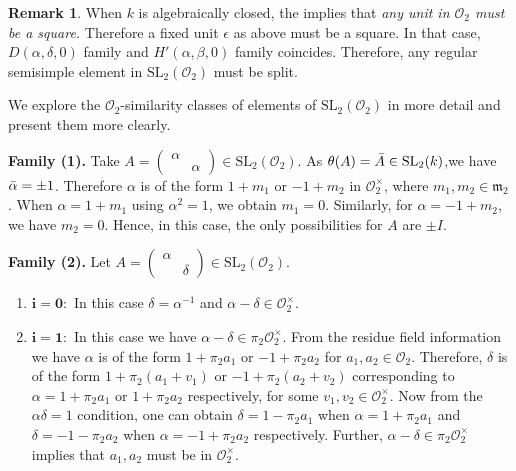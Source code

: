 \documentclass[10pt,twoside]{amsart}
\newcommand{\SL}{\mathrm{SL}}
\newcommand{\R}{\mathcal{O}_2}
\theoremstyle{definition}
\theoremstyle{definition}
\newtheorem{remark}[theorem]{Remark}
\begin{document}
\begin{remark}\label{surjpower} When $k$ is algebraically closed, the  implies that \emph{any unit in $\R$ must be a square.} Therefore a fixed unit $\epsilon$ as above must be a square. In that case, $D(\alpha, \delta, 0)$ family and $H'(\alpha, \beta, 0)$ family coincides. Therefore, any regular semisimple element in $\SL_2(\R)$ must be split. 
\end{remark}

We explore the $\R$-similarity classes of elements of $\SL_2(\R)$ in more detail and present them more clearly.

\noindent\textbf{Family (1).} Take $A = \left(\begin{array}{cc} \alpha &  \\ & \alpha
\end{array}\right)\in \SL_2(\R)$. As $\theta(A)=\Bar{A}\in \SL_2(k)$,we have $\Bar{\alpha} = \pm 1$. Therefore $\alpha$ is of the form $1 + m_1$ or $-1 + m_2$ in $\R^{\times}$, where $m_1, m_2\in \mathfrak{m}_2$. When $\alpha = 1+m_1$ using $\alpha^2=1$, we obtain $m_1=0$. Similarly, for $\alpha = -1 + m_2$, we have $m_2 = 0$. Hence, in this case, the only possibilities for $A$ are $\pm I$.

\noindent\textbf{Family (2).} Let $A = \left(\begin{array}{cc} \alpha &  \\ & \delta
\end{array}\right)\in \SL_2(\R)$. \begin{enumerate}
\item $\mathbf{i=0}:$ In this case $\delta = \alpha^{-1}$ and $\alpha - \delta\in \R^{\times}$.  
\item $\mathbf{i=1}:$ In this case we have $\alpha - \delta\in \pi_2\R^{\times}$. From the residue field information we have $\alpha$ is of the form $1+ \pi_2 a_1$ or $-1 +  \pi_2 a_2$ for $a_1, a_2 \in \R$. Therefore, $\delta$ is of the form $1 + \pi_2(a_1 + v_1)$ or $-1 + \pi_2(a_2 + v_2)$ corresponding to $\alpha = 1+ \pi_2 a_1$ or $1 + \pi_2 a_2$ respectively, for some $v_1, v_2\in \R^{\times}$. Now from the $\alpha \delta = 1$ condition, one can obtain $\delta=1-\pi_2 a_1$ when $\alpha = 1 + \pi_2 a_1$ and $\delta = -1 - \pi_2 a_2$ when $\alpha = -1 + \pi_2 a_2$ respectively. Further, $\alpha - \delta \in \pi_2\R^{\times}$ implies that $a_1, a_2$ must be in $\R^{\times}$.
\end{enumerate}
\end{document}
